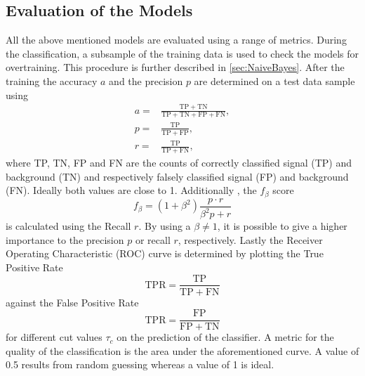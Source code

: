 \subsection{Evaluation of the Models}
All the above mentioned models are evaluated using a range of metrics. During the classification, a subsample of the training data is used to check the models for overtraining. This procedure is further described in \autoref{sec:NaiveBayes}.%
After the training the accuracy $a$ and the precision $p$ are determined on a test data sample using 
\begin{align*}
	a =& \frac{\mathrm{TP + TN}}{\mathrm{TP + TN + FP + FN}},\\
	p =&  \frac{\mathrm{TP}}{\mathrm{TP + FP}},\\
	r =& \frac{\mathrm{TP}}{\mathrm{TP + FN}},
\end{align*}
where TP, TN, FP and FN are the counts of correctly classified signal (TP) and background (TN) and respectively falsely classified signal (FP) and background (FN). Ideally both values are close to 1. 
Additionally , the $f_\beta$ score
\begin{equation}
	f_\beta = (1+\beta^2) \frac{p\cdot r}{\beta^2p+r}
\end{equation}
is calculated using the Recall $r$.
By using a $\beta \neq 1$, it is possible to give a higher importance to the precision $p$ or recall $r$, respectively.
Lastly the Receiver Operating Characteristic (ROC) curve is determined by plotting the True Positive Rate 
\begin{equation*}
	\mathrm{TPR} = \frac{\mathrm{TP}}{\mathrm{TP + FN}}
\end{equation*}
against the False Positive Rate 
\begin{equation*}
	\mathrm{TPR} = \frac{\mathrm{FP}}{\mathrm{FP + TN}}
\end{equation*}
for different cut values $\tau_c$ on the prediction of the classifier. A metric for the quality of the classification is the area under the aforementioned curve. A value of 0.5 results from random guessing whereas a value of 1 is ideal.









